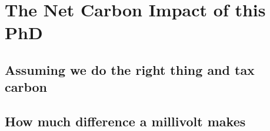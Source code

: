 

\chapter{The Net Carbon Impact of this PhD}
\section{Assuming we do the right thing and tax carbon}
\section{How much difference a millivolt makes}